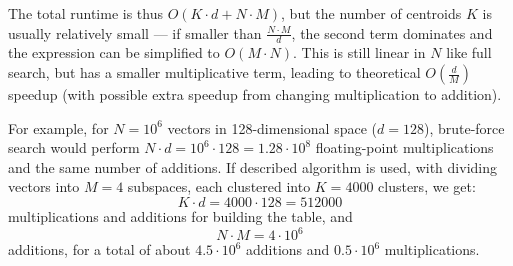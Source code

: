 The total runtime is thus $O(K \cdot d + N \cdot M)$, but the number of centroids $K$ is usually 
relatively small --- if smaller than $\frac{N \cdot M}{d}$, the second term dominates 
and the expression can be simplified to
$O(M \cdot N)$. This is still linear in $N$ like full search, but has a smaller multiplicative
term, leading to theoretical $O(\frac{d}{M})$ speedup (with possible extra speedup from changing
multiplication to addition).

For example, for $N = 10^6$ vectors in 128-dimensional space ($d = 128$), brute-force search would
perform $N \cdot d = 10^6 \cdot 128 = 1.28 \cdot 10^8$ floating-point multiplications and the same
number of additions. If described algorithm is used, with dividing vectors into $M = 4$ subspaces,
each clustered into $K = 4000$ clusters, we get:
$$ K \cdot d = 4000 \cdot 128 = 512000 $$
multiplications and additions for building the table, and
$$ N \cdot M = 4 \cdot 10^6 $$ additions, for a total of about $4.5 \cdot 10^6$ additions and 
$0.5 \cdot 10^6$ multiplications.
